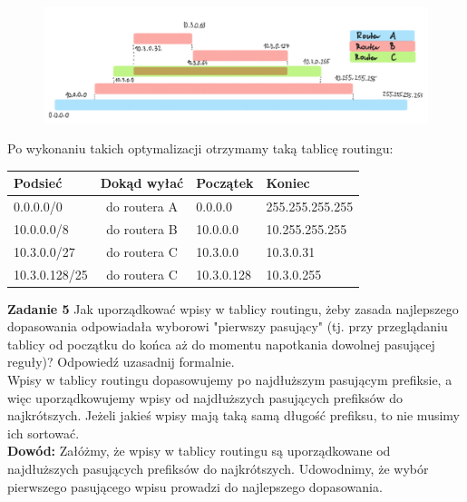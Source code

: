\documentclass[a4paper,12pt]{article}
\begin{document}
\begin{figure}[H]
    \includegraphics[width=\textwidth]{Pomocnicze/zadanie04.png}
\end{figure}

\noindent Po wykonaniu takich optymalizacji otrzymamy taką tablicę routingu:
\begin{center}
    \begin{tabular}{|l|c|l|l|}
        \hline
        Podsieć        & Dokąd wyłać  & Początek    & Koniec \\ 
        \hline
        0.0.0.0/0      & do routera A & 0.0.0.0     & 255.255.255.255 \\
        10.0.0.0/8     & do routera B & 10.0.0.0    & 10.255.255.255 \\
        10.3.0.0/27    & do routera C & 10.3.0.0    & 10.3.0.31 \\
        10.3.0.128/25  & do routera C & 10.3.0.128  & 10.3.0.255 \\ \hline
    \end{tabular}
\end{center}

\noindent \newline \textbf{Zadanie 5} \newline
Jak uporządkować wpisy w tablicy routingu, żeby zasada najlepszego dopasowania
odpowiadała wyborowi "pierwszy pasujący" (tj. przy przeglądaniu tablicy od
początku do końca aż do momentu napotkania dowolnej pasującej reguły)? Odpowiedź
uzasadnij formalnie. \\

\noindent Wpisy w tablicy routingu dopasowujemy po najdłuższym pasującym
prefiksie, a więc uporządkowujemy wpisy od najdłuższych pasujących prefiksów do
najkrótszych. Jeżeli jakieś wpisy mają taką samą długość prefiksu, to nie musimy
ich sortować. \\

\noindent \textbf{Dowód:} Załóżmy, że wpisy w tablicy routingu są uporządkowane
od najdłuższych pasujących prefiksów do najkrótszych. Udowodnimy, że wybór
pierwszego pasującego wpisu prowadzi do najlepszego dopasowania. \\
\end{document}
